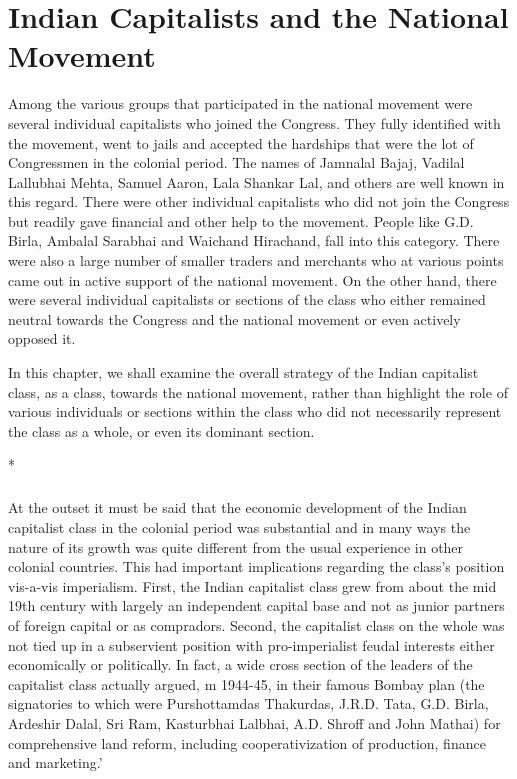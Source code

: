 \cleardoublepage
\chapter{Indian Capitalists and the National Movement}



Among the various groups that participated in the national movement were several individual capitalists who joined the Congress. They fully identified with the movement, went to jails and accepted the hardships that were the lot of Congressmen in the colonial period. The names of Jamnalal Bajaj, Vadilal Lallubhai Mehta, Samuel Aaron, Lala Shankar Lal, and others are well known in this regard. There were other individual capitalists who did not join the Congress but readily gave financial and other help to the movement. People like G.D. Birla, Ambalal Sarabhai and Waichand Hirachand, fall into this category. There were also a large number of smaller traders and merchants who at various points came out in active support of the national movement. On the other hand, there were several individual capitalists or sections of the class who either remained neutral towards the Congress and the national movement or even actively opposed it. 

In this chapter, we shall examine the overall strategy of the Indian capitalist class, as a class, towards the national movement, rather than highlight the role of various individuals or sections within the class who did not necessarily represent the class as a whole, or even its dominant section.

\begin{center}*\end{center}

\paragraph*{}


At the outset it must be said that the economic development of the Indian capitalist class in the colonial period was substantial and in many ways the nature of its growth was quite different from the usual experience in other colonial countries. This had important implications regarding the class's position vis-a-vis imperialism. First, the Indian capitalist class grew from about the mid 19th century with largely an independent capital base and not as junior partners of foreign capital or as compradors. Second, the capitalist class on the whole was not tied up in a subservient position with pro-imperialist feudal interests either economically or politically. In fact, a wide cross section of the leaders of the capitalist class actually argued, m 1944-45, in their famous Bombay plan (the signatories to which were Purshottamdas Thakurdas, J.R.D. Tata, G.D. Birla, Ardeshir Dalal, Sri Ram, Kasturbhai Lalbhai, A.D. Shroff and John Mathai) for comprehensive land reform, including cooperativization of production, finance and marketing.' 

